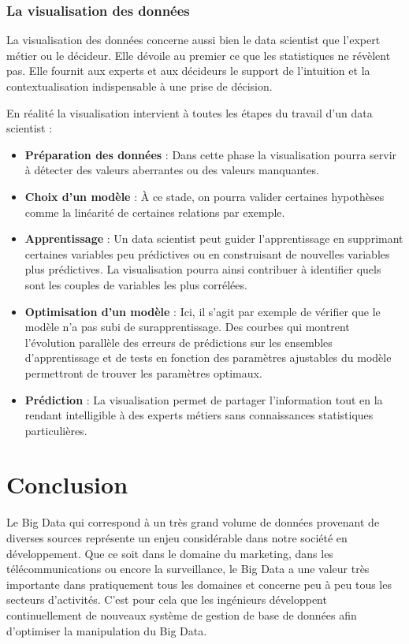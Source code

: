 \documentclass[12pt]{article}
\begin{document}
\subsubsection{La visualisation des données}
La visualisation des données concerne aussi bien le data scientist que l’expert métier ou le décideur. Elle dévoile au premier ce que les statistiques ne révèlent pas. Elle fournit aux experts et aux décideurs le support de l’intuition et la contextualisation indispensable à une prise de décision.\par
En réalité la visualisation intervient à toutes les étapes du travail d’un data scientist :
\begin{itemize}
\item \textbf{Préparation des données} : Dans cette phase la visualisation pourra servir à détecter des valeurs aberrantes ou des valeurs manquantes.
\item  \textbf{Choix d'un modèle} : À ce stade, on pourra valider certaines hypothèses comme la linéarité de certaines relations par exemple.
\item \textbf{Apprentissage} : Un data scientist peut guider l'apprentissage en supprimant certaines variables peu prédictives ou en construisant de nouvelles variables plus prédictives. La visualisation pourra ainsi contribuer à identifier quels sont les couples de variables les plus corrélées.
\item  \textbf{Optimisation d'un modèle} : Ici, il s'agit par exemple de vérifier que le modèle n'a pas subi de surapprentissage. Des courbes qui montrent l'évolution parallèle des erreurs de prédictions sur les ensembles d'apprentissage et de tests en fonction des paramètres ajustables du modèle permettront de trouver les paramètres optimaux.
\item \textbf{Prédiction} : La visualisation permet de partager l'information tout en la rendant intelligible à des experts métiers sans connaissances statistiques particulières.

\end{itemize}
\section{Conclusion}
Le Big Data qui correspond à un très grand volume de données provenant de diverses sources représente un enjeu considérable dans notre société en développement. Que ce soit dans le domaine du  marketing, dans les télécommunications ou encore la surveillance, le Big Data a une valeur très importante dans pratiquement tous les domaines et concerne peu à peu tous les secteurs d'activités. C'est pour cela que les ingénieurs développent continuellement de nouveaux système de gestion de base de données afin d'optimiser la manipulation du Big Data. 
\end{document}

